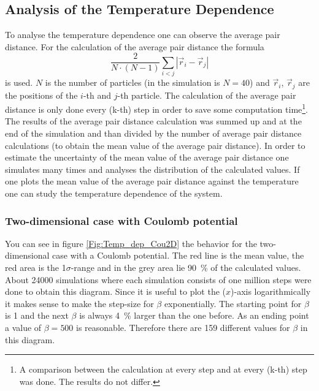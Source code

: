 \documentclass[11pt, a4paper]{article}
\numberwithin{equation}{section}
\newcommand{\remark}[1]{{\color{red}(#1)}}
\begin{document}
\subsection{Analysis of the Temperature Dependence} \label{sec:Temp_Dep}
To analyse the temperature dependence one can observe the average pair distance.
For the calculation of the average pair distance the formula
\begin{equation}
\frac{2}{N \cdot (N - 1)} \sum_{i<j} |\vec{r}_i - \vec{r}_j |
\end{equation}
is used.
$N$ is the number of particles (in the simulation is $N=40$) and $\vec{r}_i$, $\vec{r}_j$ are the positions of the $i$-th and $j$-th particle.
The calculation of the average pair distance is only done every \remark{k-th} step in order to save some computation time\footnote{A comparison between the calculation at every step and at every \remark{k-th} step was done.
The results do not differ.}.
The results of the average pair distance calculation was summed up and at the end of the simulation and than divided by the number of average pair distance calculations (to obtain the mean value of the average pair distance).
In order to estimate the uncertainty of the mean value of the average pair distance one simulates many times and analyses the distribution of the calculated values.
If one plots the mean value of the average pair distance against the temperature one can study the temperature dependence of the system.

\subsubsection{Two-dimensional case with Coulomb potential} \label{sec:2d_coulomb_tempdep}
You can see in figure \ref{Fig:Temp_dep_Cou2D} the behavior for the two-dimensional case with a Coulomb potential.
The red line is the mean value, the red area is the 1$\sigma$-range and in the grey area lie \SI{90}{\percent} of the calculated values.
About 24000 simulations where each simulation consists of one million steps were done to obtain this diagram.
Since it is useful to plot the \remark{$x$}-axis logarithmically it makes sense to make the step-size for $\beta$ exponentially.
The starting point for $\beta$ is 1 and the next $\beta$ is always \SI{4}{\percent} larger than the one before.
As an ending point a value of $\beta=500$ is reasonable.
Therefore there are 159 different values for $\beta$ in this diagram.
\end{document}
